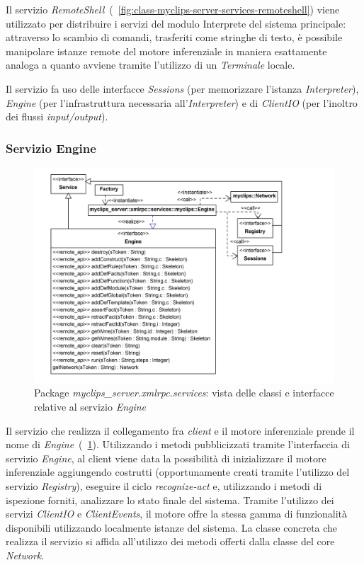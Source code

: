 Il servizio \emph{RemoteShell}~(\figurename~\ref{fig:class-myclips-server-services-remoteshell}) viene utilizzato per distribuire i servizi del modulo Interprete del sistema principale: attraverso lo scambio di comandi, trasferiti come stringhe di testo, è possibile manipolare istanze remote del motore inferenziale in maniera esattamente analoga a quanto avviene tramite l'utilizzo di un \emph{Terminale} locale.

Il servizio fa uso delle interfacce \emph{Sessions} (per memorizzare l'istanza \emph{Interpreter}), \emph{Engine} (per l'infrastruttura necessaria all'\emph{Interpreter}) e di \emph{ClientIO} (per l'inoltro dei flussi \emph{input/output}).

\subsubsection{Servizio Engine}

\begin{figure}[h]
\centering
\includegraphics[width=1\textwidth]{Immagini/Capitolo3/Classi/myclips_server_services_Engine.png}
\caption{Package \emph{myclips\_server.xmlrpc.services}: vista delle classi e interfacce relative al servizio \emph{Engine}}\label{fig:class-myclips-server-services-engine}
\end{figure}

Il servizio che realizza il collegamento fra \emph{client} e il motore inferenziale prende il nome di \emph{Engine}~(\figurename~\ref{fig:class-myclips-server-services-engine}). Utilizzando i metodi pubblicizzati tramite l'interfaccia di servizio \emph{Engine}, al client viene data la possibilità di inizializzare il motore inferenziale aggiungendo costrutti (opportunamente creati tramite l'utilizzo del servizio \emph{Registry}), eseguire il ciclo \emph{recognize-act} e, utilizzando i metodi di ispezione forniti, analizzare lo stato finale del sistema. Tramite l'utilizzo dei servizi \emph{ClientIO} e \emph{ClientEvents}, il motore offre la stessa gamma di funzionalità disponibili utilizzando localmente istanze del sistema. La classe concreta che realizza il servizio si affida all'utilizzo dei metodi offerti dalla classe del core \emph{Network}.

